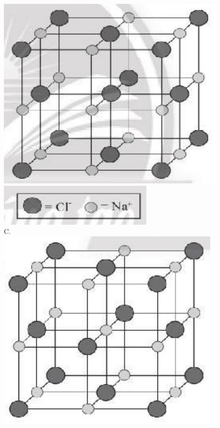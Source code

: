 \documentclass[10pt]{article}
\begin{document}
\includegraphics[max width=\textwidth, center]{2025_10_23_883c4b146e2332109fcdg-26(3)}\\
\includegraphics[max width=\textwidth, center]{2025_10_23_883c4b146e2332109fcdg-26(2)}\\
C.\\
\includegraphics[max width=\textwidth, center]{2025_10_23_883c4b146e2332109fcdg-26(4)}\\
\end{document}
